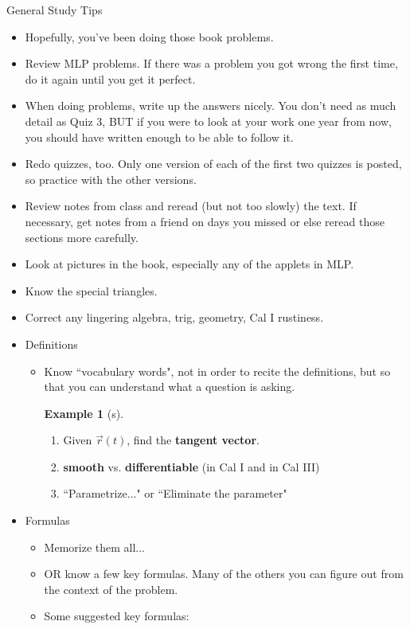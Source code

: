 \documentclass[12pt]{beamer}
\theoremstyle{plain}
\theoremstyle{definition}
\newtheorem{ex}{Example}
\begin{document}
\begin{frame}[allowframebreaks]{\small General Study Tips}
\begin{itemize}
\item Hopefully, you've been doing those book problems.
\item Review MLP problems.  If there was a problem you got wrong the first time, do it again until you get it perfect.
\item When doing problems, write up the answers nicely.  You don't need as much detail as Quiz 3, \alert{BUT} if you were to look at your work one year from now, you should have written enough to be able to follow it.
\item Redo quizzes, too.  Only one version of each of the first two quizzes is posted, so practice with the other versions.
\framebreak
\item Review notes from class and reread (but not too slowly) the text.  If necessary, get notes from a friend on days you missed or else reread those sections more carefully.
\item Look at pictures in the book, especially any of the applets in MLP.
\item Know the special triangles.
\item Correct any lingering algebra, trig, geometry, Cal I rustiness.
\framebreak
\item Definitions
	\begin{itemize}
	\item Know ``vocabulary words", not in order to recite the definitions, but so that you can understand what a question is asking.
	\begin{ex}[s]
	\begin{enumerate}
	\item Given $\overrightarrow{r}(t)$, find the {\bf tangent vector}.
	\item {\bf smooth} vs. {\bf differentiable} (in Cal I and in Cal III)
	\item ``Parametrize..." or ``Eliminate the parameter"
	\end{enumerate}
	\end{ex}
	\end{itemize}
\framebreak
\item Formulas
	\begin{itemize}
	\item Memorize them all...
	\item \alert{OR} know a few key formulas.  Many of the others you can figure out from the context of the problem. 
	\item Some suggested key formulas:

\end{itemize}
\end{itemize}
\end{frame}
\end{document}
